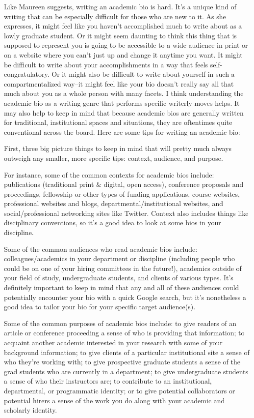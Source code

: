 Like Maureen suggests, writing an academic bio is hard. It's a unique kind of writing that can be especially difficult for those who are new to it. As she expresses, it might feel like you haven't accomplished much to write about as a lowly graduate student. Or it might seem daunting to think this thing that is supposed to represent you is going to be accessible to a wide audience in print or on a website where you can't just up and change it anytime you want. It might be difficult to write about your accomplishments in a way that feels self-congratulatory. Or it might also be difficult to write about yourself in such a compartmentalized way–it might feel like your bio doesn't really say all that much about you as a whole person with many facets. I think understanding the academic bio as a writing genre that performs specific writerly moves helps. It may also help to keep in mind that because academic bios are generally written for traditional, institutional spaces and situations, they are oftentimes quite conventional across the board. Here are some tips for writing an academic bio:

First, three big picture things to keep in mind that will pretty much always outweigh any smaller, more specific tips: context, audience, and purpose.

For instance, some of the common contexts for academic bios include: publications (traditional print \& digital, open access), conference proposals and proceedings, fellowship or other types of funding applications, course websites, professional websites and blogs, departmental/institutional websites, and social/professional networking sites like Twitter. Context also includes things like disciplinary conventions, so it's a good idea to look at some bios in your discipline.

Some of the common audiences who read academic bios include: colleagues/academics in your department or discipline (including people who could be on one of your hiring committees in the future!), academics outside of your field of study, undergraduate students, and clients of various types. It's definitely important to keep in mind that any and all of these audiences could potentially encounter your bio with a quick Google search, but it's nonetheless a good idea to tailor your bio for your specific target audience(s).

Some of the common purposes of academic bios include: to give readers of an article or conference proceeding a sense of who is providing that information; to acquaint another academic interested in your research with some of your background information; to give clients of a particular institutional site a sense of who they're working with; to give prospective graduate students a sense of the grad students who are currently in a department; to give undergraduate students a sense of who their instructors are; to contribute to an institutional, departmental, or programmatic identity; or to give potential collaborators or potential hirers a sense of the work you do along with your academic and scholarly identity.

